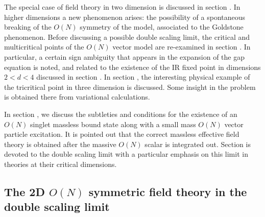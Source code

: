 The special case of field theory in two dimension is discussed in
section \label{\stwodim}. In higher dimensions a new phenomenon
arises: the possibility of a spontaneous breaking of the $O(N)$
symmetry of the model, associated to the Goldstone phenomenon.
Before discussing a possible double scaling limit, the critical
and multicritical points of the $O(N)$ vector model are
re-examined in section \label{\smulticr}. In particular, a certain
sign ambiguity that appears in the expansion of the gap equation
is noted, and related to the existence of the IR fixed point in
dimensions $2<d<4$ discussed in section \label{\sssEGRN}.  In
section \label{\ssNtricritical}, the  interesting physical example
of the tricritical point in three dimension is discussed. Some
insight in the problem is obtained there from  variational
calculations.

\par
In section  \label{\sboundst}, we discuss the subtleties and
conditions for the existence of an $O(N)$ singlet massless bound
state along with a small mass  $O(N)$ vector particle excitation.
It is pointed out that the correct massless effective field theory
is obtained after the massive $O(N)$ scalar is integrated out.
Section \label{\sdouble} is  devoted to the double scaling limit
with a particular emphasis on this limit in theories at their
critical dimensions.
\subsection{The 2D  $O(N)$ symmetric field theory in the double scaling
limit}

